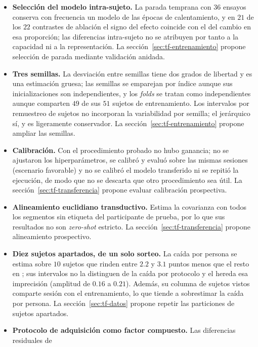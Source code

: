 \begin{itemize}
  \item \textbf{Selección del modelo intra-sujeto.} La parada temprana con $36$ ensayos conserva con
        frecuencia un modelo de las épocas de calentamiento, y en $21$ de los $22$ contrastes de ablación el
        signo del efecto coincide con el del cambio en esa proporción; las diferencias intra-sujeto no se
        atribuyen por tanto a la capacidad ni a la representación. La sección~\ref{sec:tf-entrenamiento} propone selección de parada mediante validación anidada.
  \item \textbf{Tres semillas.} La desviación entre semillas tiene dos grados de libertad y es una estimación
        gruesa; las semillas se emparejan por índice aunque sus inicializaciones son independientes, y los
        \textit{folds} \loso{} se tratan como independientes aunque comparten $49$ de sus $51$ sujetos de
        entrenamiento. Los intervalos por remuestreo de sujetos no incorporan la variabilidad por semilla; el
        jerárquico sí, y es ligeramente conservador. La sección~\ref{sec:tf-entrenamiento} propone ampliar las semillas.
  \item \textbf{Calibración.} Con el procedimiento probado no hubo ganancia; no se ajustaron los
        hiperparámetros, se calibró y evaluó sobre las mismas sesiones (escenario favorable) y no se calibró el
        modelo transferido ni se repitió la ejecución, de modo que no se descarta que otro procedimiento sea
        útil. La sección~\ref{sec:tf-transferencia} propone evaluar calibración prospectiva.
  \item \textbf{Alineamiento euclidiano transductivo.} Estima la covarianza con todos los segmentos sin
        etiqueta del participante de prueba, por lo que sus resultados no son \textit{zero-shot} estricto. La sección~\ref{sec:tf-transferencia} propone alineamiento prospectivo.
  \item \textbf{Diez sujetos apartados, de un solo sorteo.} La caída por persona se estima sobre $10$
        sujetos que rinden entre $2.2$ y $3.1$ puntos menos que el resto en \loso{}; sus intervalos no la
        distinguen de la caída por protocolo y el \idp{} hereda esa imprecisión (amplitud de $0.16$ a $0.21$).
        Además, su columna de sujetos vistos comparte sesión con el entrenamiento, lo que tiende a
        sobrestimar la caída por persona. La sección~\ref{sec:tf-datos} propone repetir las particiones de sujetos apartados.
  \item \textbf{Protocolo de adquisición como factor compuesto.} Las diferencias residuales de

\end{itemize}
